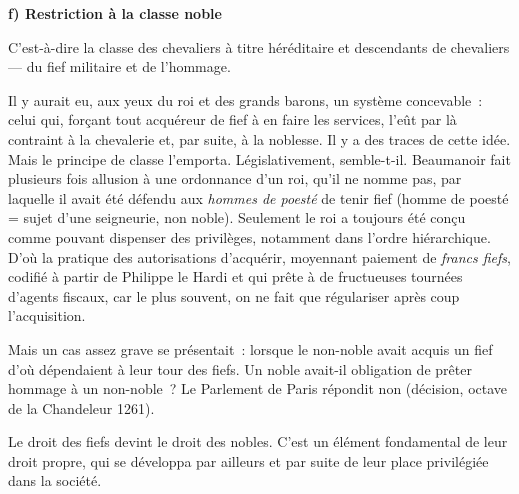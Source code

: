 \documentclass[french,twoside]{book} %
\newcommand{\labelchar}[1]{\textbf{\color{rubric} #1}}
\begin{document}
\bigbreak
\noindent \labelchar{f) Restriction à la classe noble}\par
C’est-à-dire la classe des chevaliers à titre héréditaire et descendants de chevaliers — du fief militaire et de l’hommage.\par
Il y aurait eu, aux yeux du roi et des grands barons, un système concevable : celui qui, forçant tout acquéreur de fief à en faire les services, l’eût par là contraint à la chevalerie et, par suite, à la noblesse. Il y a des traces de cette idée. Mais le principe de classe l’emporta. Législativement, semble-t-il. Beaumanoir fait plusieurs fois allusion à une ordonnance d’un roi, qu’il ne nomme pas, par laquelle il avait été défendu aux \emph{hommes de poesté} de tenir fief (homme de poesté = sujet d’une seigneurie, non noble). Seulement le roi a toujours été conçu comme pouvant dispenser des privilèges, notamment dans l’ordre hiérarchique. D’où la pratique des autorisations d’acquérir, moyennant paiement de \emph{francs fiefs}, codifié à partir de Philippe le Hardi et qui prête à de fructueuses tournées d’agents fiscaux, car le plus souvent, on ne fait que régulariser après coup l’acquisition.\par
Mais un cas assez grave se présentait : lorsque le non-noble avait acquis un fief d’où dépendaient à leur tour des fiefs. Un noble avait-il obligation de prêter hommage à un non-noble ? Le Parlement de Paris répondit non (décision, octave de la Chandeleur 1261).\par
Le droit des fiefs devint le droit des nobles. C’est un élément fondamental de leur droit propre, qui se développa par ailleurs et par suite de leur place privilégiée dans la société.
\end{document}
